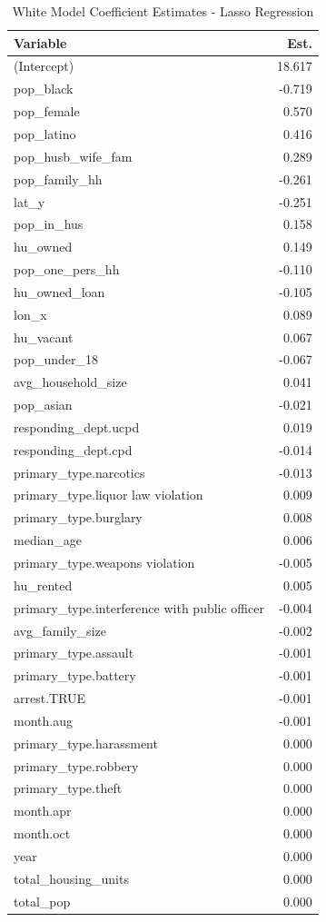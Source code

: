 \documentclass{ucetd}
\begin{document}
\begin{table}

\caption{\label{tab:white-lasso}White Model Coefficient Estimates - Lasso Regression}
\centering
\begin{tabular}[t]{l|r}
\hline
Variable & Est.\\
\hline
(Intercept) & 18.617\\
\hline
pop\_black & -0.719\\
\hline
pop\_female & 0.570\\
\hline
pop\_latino & 0.416\\
\hline
pop\_husb\_wife\_fam & 0.289\\
\hline
pop\_family\_hh & -0.261\\
\hline
lat\_y & -0.251\\
\hline
pop\_in\_hus & 0.158\\
\hline
hu\_owned & 0.149\\
\hline
pop\_one\_pers\_hh & -0.110\\
\hline
hu\_owned\_loan & -0.105\\
\hline
lon\_x & 0.089\\
\hline
hu\_vacant & 0.067\\
\hline
pop\_under\_18 & -0.067\\
\hline
avg\_household\_size & 0.041\\
\hline
pop\_asian & -0.021\\
\hline
responding\_dept.ucpd & 0.019\\
\hline
responding\_dept.cpd & -0.014\\
\hline
primary\_type.narcotics & -0.013\\
\hline
primary\_type.liquor law violation & 0.009\\
\hline
primary\_type.burglary & 0.008\\
\hline
median\_age & 0.006\\
\hline
primary\_type.weapons violation & -0.005\\
\hline
hu\_rented & 0.005\\
\hline
primary\_type.interference with public officer & -0.004\\
\hline
avg\_family\_size & -0.002\\
\hline
primary\_type.assault & -0.001\\
\hline
primary\_type.battery & -0.001\\
\hline
arrest.TRUE & -0.001\\
\hline
month.aug & -0.001\\
\hline
primary\_type.harassment & 0.000\\
\hline
primary\_type.robbery & 0.000\\
\hline
primary\_type.theft & 0.000\\
\hline
month.apr & 0.000\\
\hline
month.oct & 0.000\\
\hline
year & 0.000\\
\hline
total\_housing\_units & 0.000\\
\hline
total\_pop & 0.000\\
\hline
\end{tabular}
\end{table}
\end{document}
